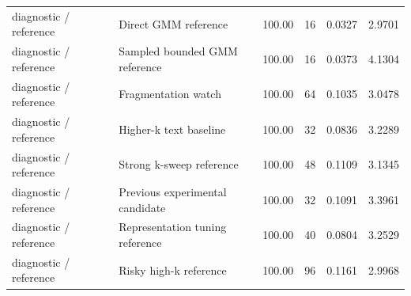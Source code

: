 \begin{table}[htbp]
\begin{tabularx}{\textwidth}{L{0.17\textwidth} L{0.31\textwidth} L{0.24\textwidth} r r r r}
diagnostic / reference &  & Direct GMM reference & 100.00 & 16 & 0.0327 & 2.9701 \\
diagnostic / reference &  & Sampled bounded GMM reference & 100.00 & 16 & 0.0373 & 4.1304 \\
diagnostic / reference &  & Fragmentation watch & 100.00 & 64 & 0.1035 & 3.0478 \\
diagnostic / reference &  & Higher-k text baseline & 100.00 & 32 & 0.0836 & 3.2289 \\
diagnostic / reference &  & Strong k-sweep reference & 100.00 & 48 & 0.1109 & 3.1345 \\
diagnostic / reference &  & Previous experimental candidate & 100.00 & 32 & 0.1091 & 3.3961 \\
diagnostic / reference &  & Representation tuning reference & 100.00 & 40 & 0.0804 & 3.2529 \\
diagnostic / reference &  & Risky high-k reference & 100.00 & 96 & 0.1161 & 2.9968 \\
\bottomrule
\end{tabularx}
\end{table}
